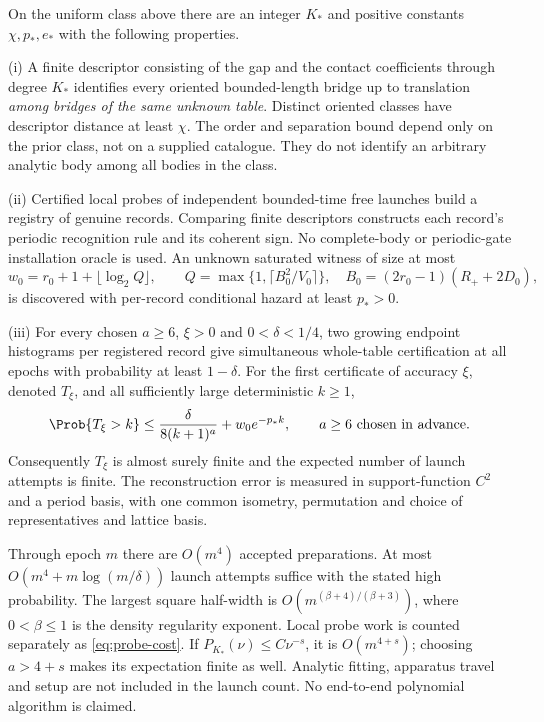 \begin{theorem}
\label{thm:main}
On the uniform class above there are an integer $K_*$ and positive
constants $\chi,p_*,e_*$ with the following properties.

\textup{(i)} A finite descriptor consisting of the gap and the contact
coefficients through degree $K_*$ identifies every oriented bounded-length
bridge up to translation \emph{among bridges of the same unknown table}.
Distinct oriented classes have descriptor distance at least $\chi$.
The order and separation bound depend only on the prior class, not on a
supplied catalogue. They do not identify an arbitrary analytic body among
all bodies in the class.

\textup{(ii)} Certified local probes of independent bounded-time free
launches build a registry of genuine records. Comparing finite descriptors
constructs each record's periodic recognition rule and its coherent sign.
No complete-body or periodic-gate installation oracle is used. An unknown
saturated witness of size at most
\begin{equation}\label{eq:witness-main}
 w_0=r_0+1+\lfloor\log_2 Q\rfloor,\qquad
 Q=\max\{1,\lceil B_0^2/V_0\rceil\},\quad
 B_0=(2r_0-1)(R_++2D_0),
\end{equation}
is discovered with per-record conditional hazard at least $p_*>0$.

\textup{(iii)} For every chosen $a\ge6$, $\xi>0$ and $0<\delta<1/4$, two growing
endpoint histograms per registered record give simultaneous whole-table
certification at all epochs with probability at least $1-\delta$.
For the first certificate of accuracy $\xi$, denoted $T_\xi$, and all
sufficiently large deterministic $k\ge1$,
\begin{equation}\label{eq:main-tail}
 \Prob\{T_\xi>k\}\le\frac{\delta}{8(k+1)^a}+w_0e^{-p_*k},
 \qquad a\ge6\ \hbox{chosen in advance}.
\end{equation}
Consequently $T_\xi$ is almost surely finite and the expected number
of launch attempts is finite. The reconstruction error is measured in
support-function $C^2$ and a period basis, with one common isometry,
permutation and choice of representatives and lattice basis.

Through epoch $m$ there are $O(m^4)$ accepted preparations. At most
$O(m^4+m\log(m/\delta))$ launch attempts suffice with the stated
high probability. The largest square half-width is
$O(m^{(\beta+4)/(\beta+3)})$, where $0<\beta\le1$ is the density
regularity exponent. Local probe work is counted separately as
\eqref{eq:probe-cost}. If $P_{K_*}(\nu)\le C\nu^{-s}$, it is
$O(m^{4+s})$; choosing $a>4+s$ makes its expectation finite as well.
Analytic fitting, apparatus travel and setup are not included in the
launch count. No end-to-end polynomial algorithm is claimed.
\end{theorem}


